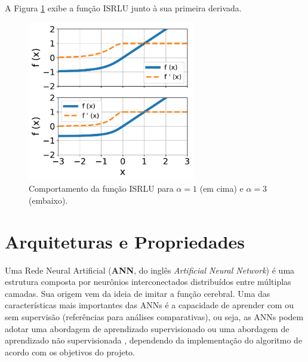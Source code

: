 A Figura \ref{fig:ann_isrlu_function} exibe a função ISRLU \citep{carlile2017improving} junto à sua primeira derivada.

\begin{figure}[H]
    \centering
    \includegraphics[width=0.65\textwidth]{figs/ann_isrlu_function.pdf}

    \caption{Comportamento da função ISRLU para $\alpha=1$ (em cima) e $\alpha=3$ (embaixo).}
    \label{fig:ann_isrlu_function}
\end{figure}


\linebreak
\newpage


\section{Arquiteturas e Propriedades}
\label{sec:ann_arch_and_prop}

Uma Rede Neural Artificial (\textbf{ANN}, do inglês \textit{Artificial Neural Network}) é uma estrutura composta por neurônios interconectados distribuídos entre múltiplas camadas. Sua origem vem da ideia de imitar a função cerebral. Uma das características mais importantes das ANNs é a capacidade de aprender com ou sem supervisão (referências para análises comparativas), ou seja, as ANNs podem adotar uma abordagem de aprendizado supervisionado ou uma abordagem de aprendizado não supervisionada \citep{haykin1999neural}, dependendo da implementação do algoritmo de acordo com os objetivos do projeto.


